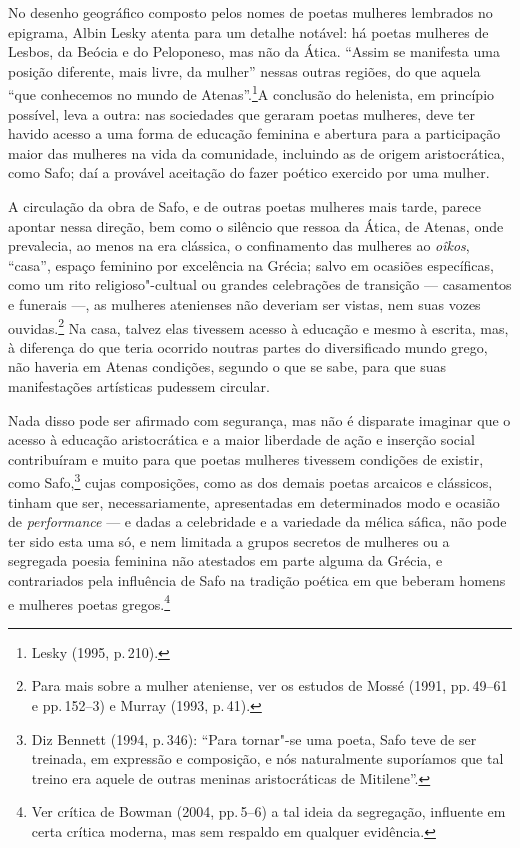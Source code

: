 No desenho geográfico composto pelos nomes de poetas mulheres
lembrados no epigrama, Albin Lesky atenta para um detalhe
notável: há poetas mulheres de Lesbos, da Beócia e do Peloponeso, mas não da
Ática. “Assim se manifesta uma posição diferente, mais livre, da mulher”
nessas outras regiões, do que aquela “que conhecemos no mundo de Atenas”.\footnote{ Lesky (1995, p.\,210).}A
conclusão do helenista, em princípio possível, leva a outra: nas sociedades
que geraram poetas mulheres, deve ter havido acesso a uma forma de educação
feminina e abertura para a participação maior das mulheres na vida da
comunidade, incluindo as de origem aristocrática, como Safo; daí a provável
aceitação do fazer poético exercido por uma mulher.

A circulação da obra de Safo, e de outras poetas mulheres mais tarde, parece
apontar nessa direção, bem como o silêncio que ressoa da Ática, de Atenas, onde
prevalecia, ao menos na era clássica, o confinamento das mulheres ao \emph{oîkos}, “casa”, espaço
feminino por excelência na Grécia; salvo em ocasiões específicas, como um rito
religioso"-cultual ou grandes celebrações de transição --- casamentos e funerais ---, as mulheres atenienses não deveriam ser vistas, nem suas
vozes ouvidas.\footnote{ Para mais sobre a mulher ateniense, ver os estudos de
Mossé (1991, pp.\,49--61 e pp.\,152--3) e Murray (1993, p.\,41).} Na casa, talvez elas
tivessem acesso à educação e mesmo à escrita, mas, à diferença do que teria
ocorrido noutras partes do diversificado mundo grego, não haveria em Atenas
condições, segundo o que se sabe, para que suas manifestações artísticas
pudessem circular.

Nada disso pode ser afirmado com segurança, mas não é disparate imaginar que o acesso
à educação aristocrática e a maior liberdade de ação e inserção social
contribuíram e muito para que poetas mulheres tivessem condições de existir,
como Safo,\footnote{ Diz Bennett (1994, p.\,346):
“Para tornar"-se uma poeta, Safo teve de ser treinada, em expressão
e composição, e nós naturalmente suporíamos que tal treino era aquele de outras
meninas aristocráticas de Mitilene”.} cujas composições, como as dos demais
poetas arcaicos e clássicos, tinham que ser, necessariamente, apresentadas em
determinados modo e ocasião de \emph{performance} --- e dadas a celebridade e a variedade da mélica sáfica, não pode ter sido esta uma só, e nem limitada
a grupos secretos de mulheres ou a segregada poesia feminina não atestados em parte alguma da Grécia, e contrariados pela influência de Safo na tradição poética em que beberam homens e mulheres poetas gregos.\footnote{Ver crítica de Bowman (2004, pp.\,5--6) a tal ideia da segregação, influente em certa crítica moderna, mas sem respaldo em qualquer evidência.}


